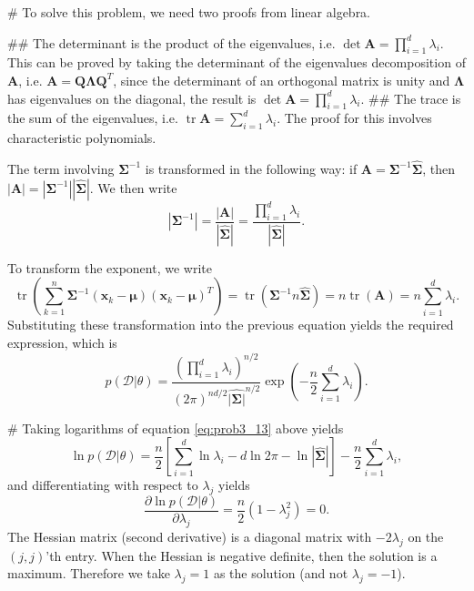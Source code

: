 \documentclass[12pt, a4paper]{article}
\newcommand{\D}{\mathcal{D}}
\newcommand{\vect}[1]{\bm{#1}}
\newcommand{\abs}[1]{\left\lvert#1\right\rvert}
\begin{document}
\begin{easylist}[enumerate]
# To solve this problem, we need two proofs from linear algebra.

\begin{easylist}

## The determinant is the product of the eigenvalues, i.e. $\det \vect{A} = \prod_{i=1}^{d} \lambda_i$.
This can be proved by taking the determinant of the eigenvalues decomposition of $\vect{A}$, i.e. $\vect{A}  = \vect{Q}  \vect{\Lambda} \vect{Q}^T$, since the determinant of an orthogonal matrix is unity and $\vect{\Lambda}$ has eigenvalues on the diagonal, the result is $\det \vect{A} = \prod_{i=1}^{d} \lambda_i$.
## The trace is the sum of the eigenvalues, i.e. $\operatorname{tr} \vect{A} =\sum_{i=1}^{d} \lambda_i$. The proof for this involves characteristic polynomials.
\end{easylist}

The  term involving $\vect{\Sigma}^{-1}$ is transformed in the following way: if $\vect{A} = \vect{\Sigma}^{-1} \hat{\vect{\Sigma}}$, then $\abs{\vect{A}} = \abs{\vect{\Sigma}^{-1}} | \hat{\vect{\Sigma}} |$. We then write
\begin{equation*}
	\abs{\vect{\Sigma}^{-1}} = \frac{\abs{\vect{A}}}{| \hat{\vect{\Sigma}} |} = \frac{\prod_{i=1}^{d} \lambda_i}{| \hat{\vect{\Sigma}} |}.
\end{equation*}

To transform the exponent, we write
\begin{equation*}
	 \operatorname{tr} \left( \sum_{k=1}^{n}  \vect{\Sigma}^{-1} \left( \vect{x}_k - \vect{\mu} \right) \left( \vect{x}_k - \vect{\mu} \right)^T \right)
	 =
	 \operatorname{tr} \left( \vect{\Sigma}^{-1} n \hat{\vect{\Sigma}}  \right)
	 =
	 n  \operatorname{tr} \left( \vect{A} \right) = n \sum_{i=1}^{d} \lambda_i.
\end{equation*}
Substituting these transformation into the previous equation yields the required expression, which is
\begin{equation}
\label{eq:prob3_13}
	p(\D | \theta) = \frac{\left( \prod_{i=1}^{d} \lambda_i \right)^{n/2}}{\left(2 \pi \right)^{nd/2} \hat{\abs{\vect{\Sigma}}}^{n/2} } \exp \left( -\frac{n}{2} \sum_{i=1}^{d} \lambda_i \right).
\end{equation}

# Taking logarithms of equation \eqref{eq:prob3_13} above yields
\begin{equation*}
	\ln p(\D | \theta) = \frac{n}{2} \left[ \sum_{i=1}^{d} \ln \lambda_i - d \ln 2 \pi - \ln | \hat{\vect{\Sigma}} |  \right] - \frac{n}{2} \sum_{i=1}^{d} \lambda_i,
\end{equation*}
and differentiating with respect to $\lambda_j$ yields
\begin{equation*}
	\frac{\partial \ln p(\D | \theta)}{\partial \lambda_j} = \frac{n}{2} \left(1 - \lambda_j^2 \right) = 0.
\end{equation*}
The Hessian matrix (second derivative) is a diagonal matrix with $-2\lambda_j$ on the $(j, j)$'th entry.
When the Hessian is negative definite, then the solution is a maximum.
Therefore we take $\lambda_j = 1$ as the solution (and not $\lambda_j = -1$).


\end{easylist}
\end{document}
